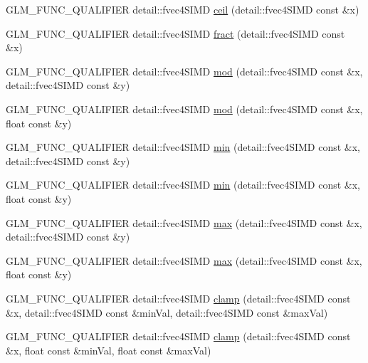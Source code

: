\begin{DoxyCompactItemize}
G\+L\+M\+\_\+\+F\+U\+N\+C\+\_\+\+Q\+U\+A\+L\+I\+F\+I\+E\+R detail\+::fvec4\+S\+I\+M\+D \hyperlink{namespaceglm_adc50f5413973998fb007fda7a6149ef5}{ceil} (detail\+::fvec4\+S\+I\+M\+D const \&x)
\item 
G\+L\+M\+\_\+\+F\+U\+N\+C\+\_\+\+Q\+U\+A\+L\+I\+F\+I\+E\+R detail\+::fvec4\+S\+I\+M\+D \hyperlink{namespaceglm_a5a003d7f27903c03744ca6271f1a9051}{fract} (detail\+::fvec4\+S\+I\+M\+D const \&x)
\item 
G\+L\+M\+\_\+\+F\+U\+N\+C\+\_\+\+Q\+U\+A\+L\+I\+F\+I\+E\+R detail\+::fvec4\+S\+I\+M\+D \hyperlink{namespaceglm_a560289b95e600d6da427ad473c1f46cf}{mod} (detail\+::fvec4\+S\+I\+M\+D const \&x, detail\+::fvec4\+S\+I\+M\+D const \&y)
\item 
G\+L\+M\+\_\+\+F\+U\+N\+C\+\_\+\+Q\+U\+A\+L\+I\+F\+I\+E\+R detail\+::fvec4\+S\+I\+M\+D \hyperlink{namespaceglm_a66a9b0ed141fd219673b9adf8e400ec0}{mod} (detail\+::fvec4\+S\+I\+M\+D const \&x, float const \&y)
\item 
G\+L\+M\+\_\+\+F\+U\+N\+C\+\_\+\+Q\+U\+A\+L\+I\+F\+I\+E\+R detail\+::fvec4\+S\+I\+M\+D \hyperlink{namespaceglm_af6ef9739a4145dc0004408132eff235b}{min} (detail\+::fvec4\+S\+I\+M\+D const \&x, detail\+::fvec4\+S\+I\+M\+D const \&y)
\item 
G\+L\+M\+\_\+\+F\+U\+N\+C\+\_\+\+Q\+U\+A\+L\+I\+F\+I\+E\+R detail\+::fvec4\+S\+I\+M\+D \hyperlink{namespaceglm_ace53be5aa101f55503d1fd863ac97de3}{min} (detail\+::fvec4\+S\+I\+M\+D const \&x, float const \&y)
\item 
G\+L\+M\+\_\+\+F\+U\+N\+C\+\_\+\+Q\+U\+A\+L\+I\+F\+I\+E\+R detail\+::fvec4\+S\+I\+M\+D \hyperlink{namespaceglm_a8003e838df57188edaa8b8fe512516a6}{max} (detail\+::fvec4\+S\+I\+M\+D const \&x, detail\+::fvec4\+S\+I\+M\+D const \&y)
\item 
G\+L\+M\+\_\+\+F\+U\+N\+C\+\_\+\+Q\+U\+A\+L\+I\+F\+I\+E\+R detail\+::fvec4\+S\+I\+M\+D \hyperlink{namespaceglm_a6a8611ddc96e204e7669872c6a68b972}{max} (detail\+::fvec4\+S\+I\+M\+D const \&x, float const \&y)
\item 
G\+L\+M\+\_\+\+F\+U\+N\+C\+\_\+\+Q\+U\+A\+L\+I\+F\+I\+E\+R detail\+::fvec4\+S\+I\+M\+D \hyperlink{namespaceglm_a5c4a12e002e5eb23b8a12639c7484378}{clamp} (detail\+::fvec4\+S\+I\+M\+D const \&x, detail\+::fvec4\+S\+I\+M\+D const \&min\+Val, detail\+::fvec4\+S\+I\+M\+D const \&max\+Val)
\item 
G\+L\+M\+\_\+\+F\+U\+N\+C\+\_\+\+Q\+U\+A\+L\+I\+F\+I\+E\+R detail\+::fvec4\+S\+I\+M\+D \hyperlink{namespaceglm_ae7db62bebbc1cdea7444d6f89313af2f}{clamp} (detail\+::fvec4\+S\+I\+M\+D const \&x, float const \&min\+Val, float const \&max\+Val)

\end{DoxyCompactItemize}
